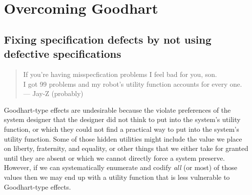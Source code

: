 \documentclass[11pt]{article}
\begin{document}
\section{Overcoming Goodhart}

%

\subsection{Fixing specification defects by not using defective specifications}

\begin{quote}
  \begin{flushright}
  If you're having misspecfication problems I feel bad for you, son.\\
  I got 99 problems and my robot's utility function accounts for every one.\\
  \vspace{0.5em}
    {\sc --- Jay-Z} (probably)
  \end{flushright}
\end{quote}

Goodhart-type effects are undesirable because the violate preferences of the
system designer that the designer did not think to put into the system's utility
function, or which they could not find a practical way to put into the system's
utility function.
%
Some of those hidden utilities might include the value we place on liberty,
fraternity, and equality, or other things that we either take for granted until
they are absent or which we cannot directly force a system preserve.
%
However, if we can systematically enumerate and codify \textit{all} (or most) of
those values then we may end up with a utility function that is less vulnerable
to Goodhart-type effects.
\end{document}
